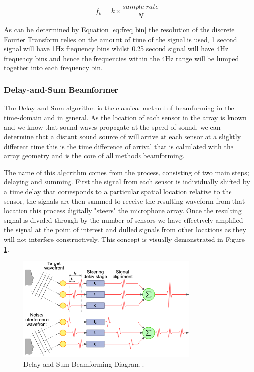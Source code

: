 \documentclass{UoNMCHA}
\numberwithin{equation}{section}
\begin{document}
    \begin{equation}
        f_k = k \times \frac{sample\;rate}{N}
        \label{eq:freq bin}
    \end{equation}
    
    As can be determined by Equation \ref{eq:freq bin} the resolution of the discrete Fourier Transform relies on the amount of time of the signal is used, 1 second signal will have 1Hz frequency bins whilst 0.25 second signal will have 4Hz frequency bins and hence the frequencies within the 4Hz range will be lumped together into each frequency bin.
    
\subsubsection{Delay-and-Sum Beamformer} \label{sec:DAS Algorithm}
    The Delay-and-Sum algorithm is the classical method of beamforming in the time-domain and in general. As the location of each sensor in the array is known and we know that sound waves propogate at the speed of sound, we can determine that a distant sound source of will arrive at each sensor at a slightly different time this is the time difference of arrival that is calculated with the array geometry and is the core of all methods beamforming.
    
    The name of this algorithm comes from the process, consisting of two main steps; delaying and summing. First the signal from each sensor is individually shifted by a time delay that corresponds to a particular spatial location relative to the sensor, the signals are then summed to receive the resulting waveform from that location \citep{GreWeb} this process digitally "steers" the microphone array. Once the resulting signal is divided through by the number of sensors we have effectively amplified the signal at the point of interest and dulled signals from other locations as they will not interfere constructively. This concept is visually demonstrated in Figure \ref{fig:das-diagram}.
    
    \begin{figure}[H]
        \centering
        \includegraphics[keepaspectratio, width = 0.8\textwidth]{Figures/DAS-Diagram.png}
        \caption{Delay-and-Sum Beamforming Diagram \citep{GreWeb}.}
        \label{fig:das-diagram}
    \end{figure}
\end{document}
